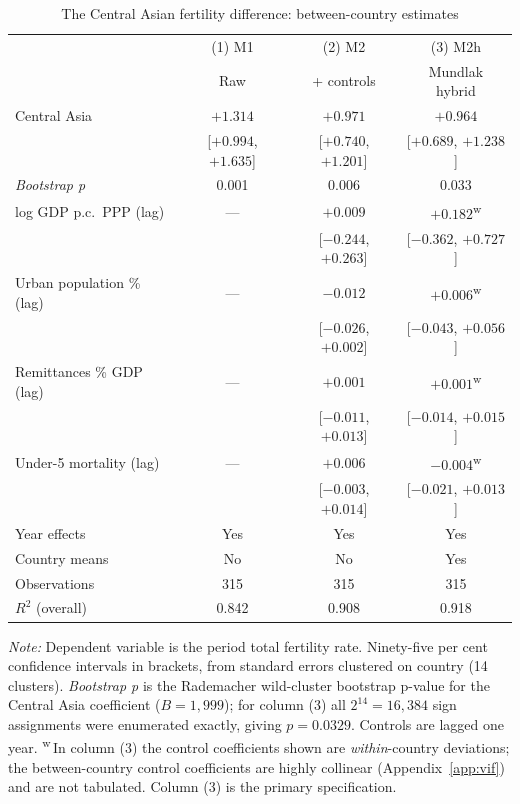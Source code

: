 \begin{table}[htbp]
\centering
\caption{The Central Asian fertility difference: between-country estimates}
\label{tab:layerA}
\small
\begin{tabular}{lccc}
\toprule
 & (1) M1 & (2) M2 & (3) M2h \\
 & Raw & + controls & Mundlak hybrid \\
\midrule
Central Asia            & $+1.314$ & $+0.971$ & $+0.964$ \\
                        & [$+0.994$, $+1.635$] & [$+0.740$, $+1.201$] & [$+0.689$, $+1.238$] \\
\addlinespace
\quad \emph{Bootstrap p} & 0.001 & 0.006 & 0.033 \\
\midrule
log GDP p.c.\ PPP (lag) & --- & $+0.009$ & $+0.182$\textsuperscript{w} \\
                        &     & [$-0.244$, $+0.263$] & [$-0.362$, $+0.727$] \\
Urban population \% (lag) & --- & $-0.012$ & $+0.006$\textsuperscript{w} \\
                        &     & [$-0.026$, $+0.002$] & [$-0.043$, $+0.056$] \\
Remittances \% GDP (lag) & --- & $+0.001$ & $+0.001$\textsuperscript{w} \\
                        &     & [$-0.011$, $+0.013$] & [$-0.014$, $+0.015$] \\
Under-5 mortality (lag) & --- & $+0.006$ & $-0.004$\textsuperscript{w} \\
                        &     & [$-0.003$, $+0.014$] & [$-0.021$, $+0.013$] \\
\midrule
Year effects            & Yes & Yes & Yes \\
Country means           & No  & No  & Yes \\
Observations            & 315 & 315 & 315 \\
$R^2$ (overall)         & 0.842 & 0.908 & 0.918 \\
\bottomrule
\end{tabular}

\begin{minipage}{\textwidth}\footnotesize
\vspace{4pt}
\emph{Note:} Dependent variable is the period total fertility rate. Ninety-five per cent
confidence intervals in brackets, from standard errors clustered on country (14 clusters).
\emph{Bootstrap p} is the Rademacher wild-cluster bootstrap p-value for the Central Asia
coefficient ($B = 1{,}999$); for column (3) all $2^{14} = 16{,}384$ sign assignments were
enumerated exactly, giving $p = 0.0329$. Controls are lagged one year.
\textsuperscript{w}\,In column (3) the control coefficients shown are \emph{within}-country
deviations; the between-country control coefficients are highly collinear
(Appendix~\ref{app:vif}) and are not tabulated. Column (3) is the primary specification.
\end{minipage}
\end{table}
